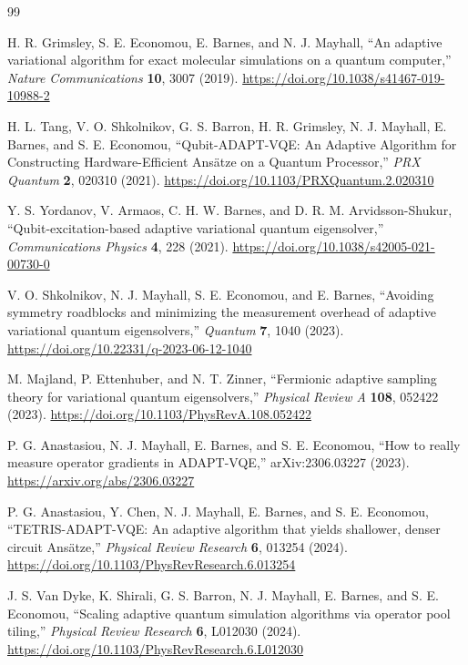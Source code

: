 \documentclass[11pt]{article}
\begin{document}
\begin{thebibliography}{99}

H. R. Grimsley, S. E. Economou, E. Barnes, and N. J. Mayhall,
``An adaptive variational algorithm for exact molecular simulations on a quantum computer,''
\emph{Nature Communications} \textbf{10}, 3007 (2019).
\url{https://doi.org/10.1038/s41467-019-10988-2}

H. L. Tang, V. O. Shkolnikov, G. S. Barron, H. R. Grimsley, N. J. Mayhall, E. Barnes, and S. E. Economou,
``Qubit-ADAPT-VQE: An Adaptive Algorithm for Constructing Hardware-Efficient Ans\"atze on a Quantum Processor,''
\emph{PRX Quantum} \textbf{2}, 020310 (2021).
\url{https://doi.org/10.1103/PRXQuantum.2.020310}

Y. S. Yordanov, V. Armaos, C. H. W. Barnes, and D. R. M. Arvidsson-Shukur,
``Qubit-excitation-based adaptive variational quantum eigensolver,''
\emph{Communications Physics} \textbf{4}, 228 (2021).
\url{https://doi.org/10.1038/s42005-021-00730-0}

V. O. Shkolnikov, N. J. Mayhall, S. E. Economou, and E. Barnes,
``Avoiding symmetry roadblocks and minimizing the measurement overhead of adaptive variational quantum eigensolvers,''
\emph{Quantum} \textbf{7}, 1040 (2023).
\url{https://doi.org/10.22331/q-2023-06-12-1040}

M. Majland, P. Ettenhuber, and N. T. Zinner,
``Fermionic adaptive sampling theory for variational quantum eigensolvers,''
\emph{Physical Review A} \textbf{108}, 052422 (2023).
\url{https://doi.org/10.1103/PhysRevA.108.052422}

P. G. Anastasiou, N. J. Mayhall, E. Barnes, and S. E. Economou,
``How to really measure operator gradients in ADAPT-VQE,''
arXiv:2306.03227 (2023).
\url{https://arxiv.org/abs/2306.03227}

P. G. Anastasiou, Y. Chen, N. J. Mayhall, E. Barnes, and S. E. Economou,
``TETRIS-ADAPT-VQE: An adaptive algorithm that yields shallower, denser circuit Ans\"atze,''
\emph{Physical Review Research} \textbf{6}, 013254 (2024).
\url{https://doi.org/10.1103/PhysRevResearch.6.013254}

J. S. Van Dyke, K. Shirali, G. S. Barron, N. J. Mayhall, E. Barnes, and S. E. Economou,
``Scaling adaptive quantum simulation algorithms via operator pool tiling,''
\emph{Physical Review Research} \textbf{6}, L012030 (2024).
\url{https://doi.org/10.1103/PhysRevResearch.6.L012030}


\end{thebibliography}
\end{document}
